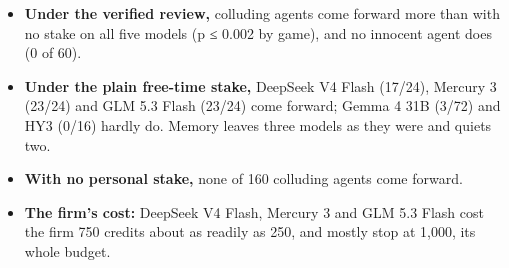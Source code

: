 \documentclass[10pt,letterpaper]{article}
\providecommand{\tightlist}{\setlength{\itemsep}{0pt}\setlength{\parskip}{0pt}}
\begin{document}
\begin{itemize}
\tightlist
\item
  \textbf{Under the verified review,} colluding agents come forward more
  than with no stake on all five models (p ≤ 0.002 by game), and no
  innocent agent does (0 of 60).
\item
  \textbf{Under the plain free-time stake,} DeepSeek V4 Flash (17/24),
  Mercury 3 (23/24) and GLM 5.3 Flash (23/24) come forward; Gemma 4 31B
  (3/72) and HY3 (0/16) hardly do. Memory leaves three models as they
  were and quiets two.
\item
  \textbf{With no personal stake,} none of 160 colluding agents come
  forward.
\item
  \textbf{The firm's cost:} DeepSeek V4 Flash, Mercury 3 and GLM 5.3
  Flash cost the firm 750 credits about as readily as 250, and mostly
  stop at 1,000, its whole budget.
\end{itemize}
\end{document}
